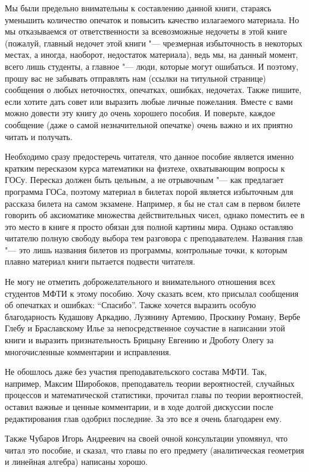 Мы были предельно внимательны к составлению данной книги, стараясь уменьшить количество опечаток и повысить качество излагаемого материала. Но мы отказываемся от ответственности за всевозможные недочеты в этой книге (пожалуй, главный недочет этой книги "--- чрезмерная избыточность в некоторых местах, а иногда, наоборот, недостаток материала), ведь мы, на данный момент, всего лишь студенты, а главное "--- люди, которые могут ошибаться. И поэтому, прошу вас не забывать отправлять нам (ссылки на титульной странице) сообщения о любых неточностях, опечатках, ошибках, недочетах. Также пишите, если хотите дать совет или выразить любые личные пожелания. Вместе с вами можно довести эту книгу до очень хорошего пособия. И поверьте, каждое сообщение (даже о самой незначительной опечатке) очень важно и их приятно читать и получать.

Необходимо сразу предостеречь читателя, что данное пособие является именно кратким пересказом курса математики на физтехе, охватывающим вопросы к ГОСу. Пересказ должен быть цельным, а не отрывочным "--- как предлагает программа ГОСа, поэтому материал в билетах порой является избыточным для рассказа билета на самом экзамене. Например, я бы не стал сам в первом билете говорить об аксиоматике множества действительных чисел, однако поместить ее в это место в книге я просто обязан для полной картины мира. Однако оставляю читателю полную свободу выбора тем разговора с преподавателем. Названия глав "--- это лишь названия билетов из программы, контрольные точки, к которым плавно материал книги пытается подвести читателя.

Не могу не отметить доброжелательного и внимательного отношения всех студентов МФТИ к этому пособию. Хочу сказать всем, кто присылал сообщения об опечатках и ошибках: ``Спасибо''. Также хочется выразить особую благодарность Кудашову Аркадию, Лузянину Артемию, Проскину Роману, Вербе Глебу и Браславскому Илье за непосредственное соучастие в написании этой книги и выразить признательность Брицыну Евгению и Дроботу Олегу за многочисленные комментарии и исправления.

Не обошлось даже без участия преподавательского состава МФТИ. Так, например, Максим Широбоков, преподаватель теории вероятностей, случайных процессов и математической статистики, прочитал главы по теории вероятностей, оставил важные и ценные комментарии, и в ходе долгой дискуссии после редактирования глав одобрил последние. За это все я очень благодарен ему.

Также Чубаров Игорь Андреевич на своей очной консультации упомянул, что читал это пособие, и сказал, что главы по его предмету (аналитическая геометрия и линейная алгебра) написаны хорошо.
 
